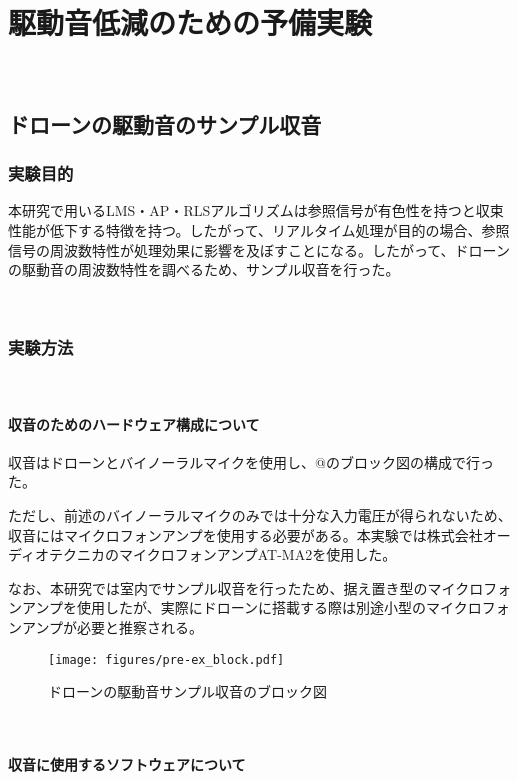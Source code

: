 \
\chapter{駆動音低減のための予備実験}\label{noise-pre-experiment}

\
\section{ドローンの駆動音のサンプル収音}\label{record-drone}

\subsection{実験目的}\label{purpose-drone}

本研究で用いるLMS・AP・RLSアルゴリズムは参照信号が有色性を持つと収束性能が低下する特徴を持つ。したがって、リアルタイム処理が目的の場合、参照信号の周波数特性が処理効果に影響を及ぼすことになる。したがって、ドローンの駆動音の周波数特性を調べるため、サンプル収音を行った。

\
\subsection{実験方法}\label{instruction-drone}

\
\subsubsection{収音のためのハードウェア構成について}\label{hardware-for-record}

収音はドローンとバイノーラルマイクを使用し、@のブロック図の構成で行った。

ただし、前述のバイノーラルマイクのみでは十分な入力電圧が得られないため、収音にはマイクロフォンアンプを使用する必要がある。本実験では株式会社オーディオテクニカのマイクロフォンアンプAT-MA2を使用した。

なお、本研究では室内でサンプル収音を行ったため、据え置き型のマイクロフォンアンプを使用したが、実際にドローンに搭載する際は別途小型のマイクロフォンアンプが必要と推察される。
\begin{figure}[H]
\centering
\texttt{[image: figures/pre-ex\_block.pdf]}
\caption{ドローンの駆動音サンプル収音のブロック図}
\label{fig:pre-ex_block}
\end{figure}

\
\subsubsection{収音に使用するソフトウェアについて}\label{software-for-record}

